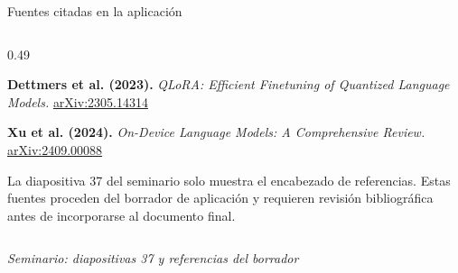 \documentclass[aspectratio=169,10pt,spanish]{beamer}
\newcommand{\fuente}[1]{\vspace{0.05cm}\hfill{\color{bpNavy!65}\tiny\textit{Seminario: diapositivas #1}}}
\begin{document}
\begin{frame}{Fuentes citadas en la aplicación}
\begin{columns}[T,onlytextwidth]
\begin{column}{0.49\textwidth}
            \begin{tcolorbox}[colback=white,colframe=bpBlue,arc=1.2mm]
                \scriptsize
                \textbf{Dettmers et al. (2023).}
                \textit{QLoRA: Efficient Finetuning of Quantized Language Models.}
                \href{https://arxiv.org/abs/2305.14314}{arXiv:2305.14314}
            \end{tcolorbox}
            \begin{tcolorbox}[colback=bpLightGray,colframe=bpRust,arc=1.2mm]
                \scriptsize
                \textbf{Xu et al. (2024).}
                \textit{On-Device Language Models: A Comprehensive Review.}
                \href{https://arxiv.org/abs/2409.00088}{arXiv:2409.00088}
            \end{tcolorbox}
            \begin{tcolorbox}[colback=bpRed!5,colframe=bpRed,arc=1.2mm]
                \tiny
                La diapositiva 37 del seminario solo muestra el encabezado de referencias.
                Estas fuentes proceden del borrador de aplicación y requieren revisión bibliográfica
                antes de incorporarse al documento final.
            \end{tcolorbox}
        \end{column}
    \end{columns}
    \fuente{37 y referencias del borrador}
\end{frame}
\end{document}
